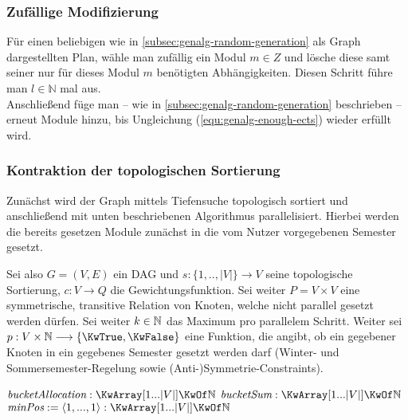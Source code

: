 \subsubsection{Zufällige Modifizierung}
\label{subsec:genalg-random-modification}
Für einen beliebigen wie in \ref{subsec:genalg-random-generation} als Graph dargestellten Plan, wähle man zufällig ein Modul $m \in Z$ und lösche diese samt seiner nur für dieses Modul $m$ benötigten Abhängigkeiten. Diesen Schritt führe man $l \in \mathbb{N}$ mal aus.\\
Anschließend füge man -- wie in \ref{subsec:genalg-random-generation} beschrieben -- erneut Module hinzu, bis Ungleichung (\ref{equ:genalg-enough-ects}) wieder erfüllt wird.

\subsubsection{Kontraktion der topologischen Sortierung}
\label{subsec:genalg-contract-topolog-sort}
Zunächst wird der Graph mittels Tiefensuche topologisch sortiert und
anschließend  mit unten beschriebenen Algorithmus parallelisiert.
Hierbei werden die bereits gesetzen Module zunächst in die vom Nutzer vorgegebenen Semester gesetzt.

Sei also $G = (V,E)$ ein DAG und $s: \{1,..,|V|\} \to V$ seine topologische Sortierung, $c: V \to Q$ die Gewichtungsfunktion. Sei weiter $P = V \times V$ eine symmetrische, transitive Relation von Knoten, welche nicht parallel gesetzt werden dürfen.
Sei weiter $ k \in \mathbb{N} $ das Maximum pro parallelem Schritt.
Weiter sei $ p: V \times \NN \to \{\KwTrue, \KwFalse\} $ eine Funktion, die angibt, ob ein gegebener Knoten in ein gegebenes Semester gesetzt werden darf (Winter- und Sommersemester-Regelung sowie (Anti-)Symmetrie-Constraints).

\begin{algorithm}
	$\Var{bucketAllocation} : \KwArray [1...|V|] \KwOf \NN $ \;
	$\Var{bucketSum} : \KwArray [1...|V|] \KwOf \NN $ \;
	$\Var{minPos} := \langle 1,...,1 \rangle: \KwArray [1...|V|] \KwOf \NN $ \;
	\BlankLine
\end{algorithm}

